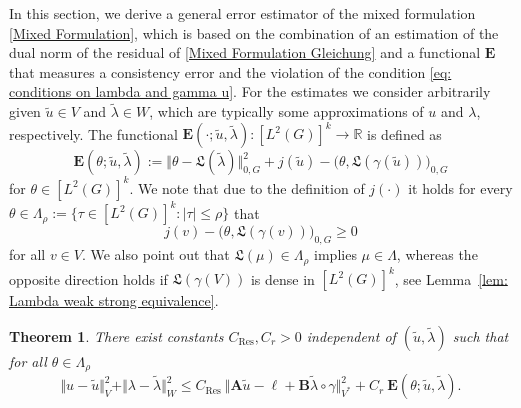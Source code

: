 \documentclass[12pt,twoside,reqno]{amsart}
\newtheorem{theorem}{Theorem}[section]
\theoremstyle{definition}
\numberwithin{equation}{section}
\renewcommand{\L}{\mathfrak{L}}
\newcommand{\B} {\bm{B}}
\newcommand{\E} {\bm{E}}
\newcommand{\norm}[1]    {\Vert #1 \Vert}
\begin{document}
    In this section, we derive a general error estimator of the mixed formulation \eqref{Mixed Formulation}, which is based on the combination of an estimation of the dual norm of the residual of \eqref{Mixed Formulation Gleichung} and a functional $\E$ that measures a consistency error and the violation of the condition \eqref{eq: conditions on lambda and gamma u}. 
    For the estimates we consider arbitrarily given $\tilde{u}\in V$ and $\tilde{\lambda}\in W$, which are typically some approximations of $u$ and $\lambda$, respectively. The functional $\E(\cdot;\tilde{u},\tilde{\lambda}):[L^2(G)]^k \rightarrow \mathbb{R}$ is defined as 
    \begin{equation*}%
        \E(\theta;\tilde{u},\tilde{\lambda}):= \norm{{\theta}-\L(\tilde{\lambda})}_{0,G}^2+j(\tilde{u})-\bigl(\theta,\L(\gamma(\tilde{u}))\bigr)_{0,G}
    \end{equation*}
    for $\theta\in [L^2(G)]^k$.
    We note that due to the definition of $j(\cdot)$ it holds for every $\theta\in\Lambda_\rho:=\{\tau\in [L^2(G)]^k: |\tau|\leq \rho\}$ that
    \begin{equation}\label{eq: j-mu geq 0}
        j(v)- \bigl(\theta,\L(\gamma(v))\bigr)_{0,G}\geq 0
    \end{equation}
    for all $v\in V$. We also point out that $\L(\mu) \in \Lambda_\rho$ implies $\mu \in \Lambda$, whereas the opposite direction holds if $\L(\gamma(V))$ is dense in $[L^2(G)]^k$, see Lemma~\ref{lem: Lambda weak strong equivalence}. 

 
    \begin{theorem}\label{thm: Weighted functional First estimation}
        There exist constants $C_{\text{Res}}, C_r>0$ independent of $(\tilde{u},\tilde{\lambda})$ such that for all $\theta\in \Lambda_\rho$
        \begin{equation}\label{eq: First upper error estimate}
            \norm{u-\tilde{u}}_V^2+\norm{{\lambda}-\tilde{\lambda}}_{W}^2\leq C_{\text{Res}}\:\norm{\bm{A}\tilde{u}-\bm{\ell}+\B\tilde{\lambda}\circ\gamma}_{V^*}^2+C_r\:\bm{E}(\theta;\tilde{u},\tilde{\lambda}).
        \end{equation}

    \end{theorem}
\end{document}
